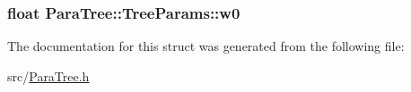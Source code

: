 \subsubsection[{\texorpdfstring{w0}{w0}}]{\setlength{\rightskip}{0pt plus 5cm}float Para\+Tree\+::\+Tree\+Params\+::w0}\hypertarget{struct_para_tree_1_1_tree_params_acd7a09e825d636bcf13adf7259599cf3}{}\label{struct_para_tree_1_1_tree_params_acd7a09e825d636bcf13adf7259599cf3}


The documentation for this struct was generated from the following file\+:\begin{DoxyCompactItemize}
\item 
src/\hyperlink{_para_tree_8h}{Para\+Tree.\+h}\end{DoxyCompactItemize}
